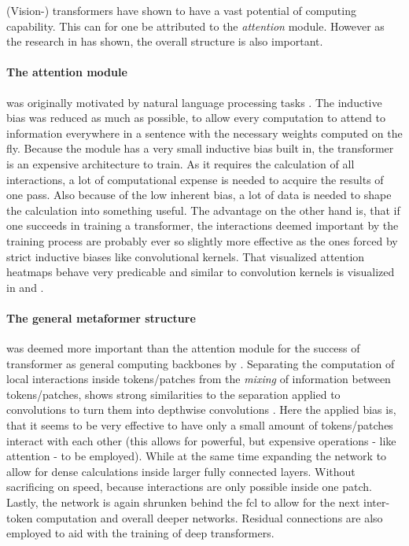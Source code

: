 (Vision-) transformers have shown to have a vast potential of computing capability. 
This can for one be attributed to the \emph{attention} module. 
However as the research in \cite{metaformerPaper} has shown, the overall structure is also important.

\paragraph{The attention module} was originally motivated by natural language processing tasks \cite{attentionIsAllYouNeed}. The inductive bias was reduced as much as possible, to allow every computation to attend to information everywhere in a sentence with the necessary weights computed on the fly.
Because the module has a very small inductive bias built in, the transformer is an expensive architecture to train. 
As it requires the calculation of all interactions, a lot of computational expense is needed to acquire the results of one pass.
Also because of the low inherent bias, a lot of data is needed to shape the calculation into something useful.
The advantage on the other hand is, that if one succeeds in training a transformer, the interactions deemed important by the training process are probably ever so slightly more effective as the ones forced by strict inductive biases like convolutional kernels. That visualized attention heatmaps behave very predicable and similar to convolution kernels is visualized in \cite{dinoPaper} and \cite{imageWorth16x16}.

\paragraph{The general metaformer structure} was deemed more important than the attention module for the success of transformer as general computing backbones by \cite{metaformerPaper}.
Separating the computation of local interactions inside tokens/patches from the \emph{mixing} of information between tokens/patches, shows strong similarities to the separation applied to convolutions to turn them into depthwise convolutions \cite{mobileNetPaper}.
Here the applied bias is, that it seems to be very effective to have only a small amount of tokens/patches interact with each other (this allows for powerful, but expensive operations - like attention - to be employed).
While at the same time expanding the network to allow for dense calculations inside larger fully connected layers. Without sacrificing on speed, because interactions are only possible inside one patch.
Lastly, the network is again shrunken behind the fcl to allow for the next inter-token computation and overall deeper networks.
Residual connections are also employed to aid with the training of deep transformers.

